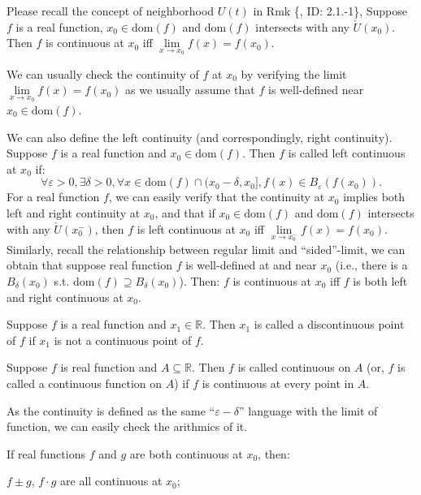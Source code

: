 \documentclass{article}
\begin{document}
\begin{Rmk}{}
    \begin{compactenum}
        \item Please recall the concept of neighborhood $U(t)$ in Rmk \{, ID: 2.1.-1\}, \textcolor{Th}{Suppose $f$ is a real function, $x_0\in\text{dom}(f)$ and $\text{dom}(f)$ intersects with any $\check{U}(x_0)$. Then $f$ is continuous at $x_0$ iff $\lim\limits_{x\to x_0} f(x) = f(x_0)$.}
        \item We can usually check the continuity of $f$ at $x_0$ by verifying the limit $\lim\limits_{x\to x_0} f(x) = f(x_0)$ as we usually assume that $f$ is well-defined near $x_0\in\text{dom}(f)$.
        \item We can also define the left continuity (and correspondingly, right continuity). \textcolor{Df}{Suppose $f$ is a real function and $x_0\in\text{dom}(f)$. Then $f$ is called left continuous at $x_0$ if:
        $$\forall \varepsilon>0, \exists\delta>0, \forall x\in\text{dom}(f)\cap(x_0-\delta, x_0], f(x)\in B_\varepsilon(f(x_0)).$$} For a real function $f$, we can easily verify that \textcolor{Th}{the continuity at $x_0$ implies both left and right continuity at $x_0$}, and that \textcolor{Th}{if $x_0\in\text{dom}(f)$ and $\text{dom}(f)$ intersects with any $\check{U}(x_0^-)$, then $f$ is left continuous at $x_0$ iff $\lim\limits_{x\to x_0^-} f(x) = f(x_0)$.} Similarly, recall the relationship between regular limit and ``sided''-limit, we can obtain that \textcolor{Th}{suppose real function $f$ is well-defined at and near $x_0$ (i.e., there is a $B_\delta(x_0)$ s.t. $\text{dom}(f)\supseteq B_\delta(x_0)$). Then: $f$ is continuous at $x_0$ iff $f$ is both left and right continuous at $x_0$.}
        \item \textcolor{Df}{Suppose $f$ is a real function and $x_1\in\mathbb{R}$. Then $x_1$ is called a discontinuous point of $f$ if $x_1$ is not a continuous point of $f$.}
        \item \textcolor{Df}{Suppose $f$ is real function and $A\subseteq\mathbb{R}$. Then $f$ is called continuous on $A$ (or, $f$ is called a continuous function on $A$) if $f$ is continuous at every point in $A$.}
        \item As the continuity is defined as the same ``$\varepsilon-\delta$'' language with the limit of function, we can easily check the arithmics of it. \textcolor{Th}{If real functions $f$ and $g$ are both continuous at $x_0$, then: 
        \begin{compactenum}
            \item $f\pm g$, $f\cdot g$ are all continuous at $x_0$;

\end{compactenum}}
\end{compactenum}
\end{Rmk}
\end{document}

